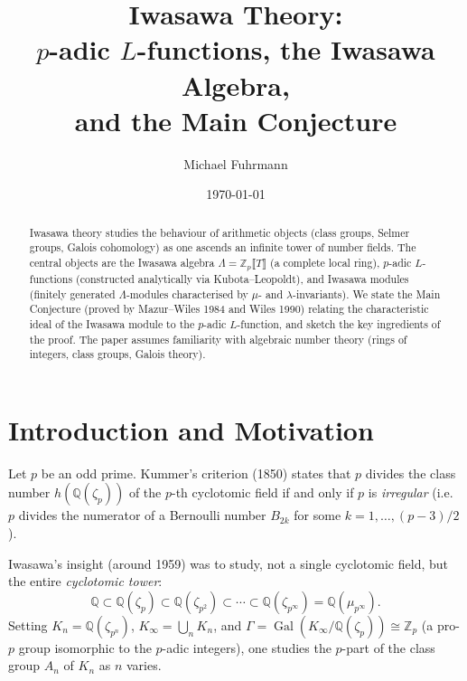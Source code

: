 \documentclass[12pt,a4paper]{amsart}
\theoremstyle{definition}
\newcommand{\Q}{\mathbb{Q}}
\newcommand{\Zp}{\mathbb{Z}_p}
\DeclareMathOperator{\Gal}{Gal}
\newcommand{\cylp}{\mathbb{Q}(\mu_{p^\infty})}
\begin{document}

\title{Iwasawa Theory:\\
       $p$-adic $L$-functions, the Iwasawa Algebra,\\
       and the Main Conjecture}

\author{Michael Fuhrmann}
\address{Specialist Mathematics Project, Build 119}
\date{\today}

\begin{abstract}
Iwasawa theory studies the behaviour of arithmetic objects (class groups,
Selmer groups, Galois cohomology) as one ascends an infinite tower of number
fields.  The central objects are the Iwasawa algebra $\Lambda = \Zp\llbracket T \rrbracket$
(a complete local ring), $p$-adic $L$-functions (constructed analytically
via Kubota--Leopoldt), and Iwasawa modules (finitely generated $\Lambda$-modules
characterised by $\mu$- and $\lambda$-invariants).  We state the Main Conjecture
(proved by Mazur--Wiles 1984 and Wiles 1990) relating the characteristic ideal of the
Iwasawa module to the $p$-adic $L$-function, and sketch the key ingredients
of the proof.  The paper assumes familiarity with algebraic number theory
(rings of integers, class groups, Galois theory).
\end{abstract}

\maketitle
\tableofcontents

\section{Introduction and Motivation}

Let $p$ be an odd prime.  Kummer's criterion (1850) states that $p$ divides the
class number $h(\Q(\zeta_p))$ of the $p$-th cyclotomic field if and only if
$p$ is \emph{irregular} (i.e.\ $p$ divides the numerator of a Bernoulli number
$B_{2k}$ for some $k = 1, \ldots, (p-3)/2$).

Iwasawa's insight (around 1959) was to study, not a single cyclotomic field,
but the entire \emph{cyclotomic tower}:
\[
  \Q \subset \Q(\zeta_p) \subset \Q(\zeta_{p^2}) \subset \cdots
  \subset \Q(\zeta_{p^\infty}) = \cylp.
\]
Setting $K_n = \Q(\zeta_{p^n})$, $K_\infty = \bigcup_n K_n$, and
$\Gamma = \Gal(K_\infty/\Q(\zeta_p)) \cong \Zp$ (a pro-$p$ group isomorphic
to the $p$-adic integers), one studies the $p$-part of the class group $A_n$
of $K_n$ as $n$ varies.
\end{document}
